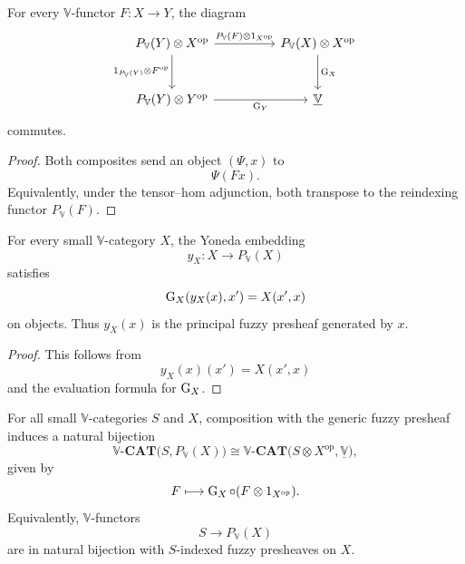 \begin{proposition}
\label{prop:enriched-naturality-generic-fuzzy-presheaf}
    For every \(\mathbb V\)-functor \(F:X\to Y\), the diagram
    \[
        \begin{tikzcd}[column sep=huge,row sep=large]
            P_{\mathbb V}(Y)\otimes X^{\mathrm{op}}
                \arrow[r,"P_{\mathbb V}(F)\otimes 1_{X^{\mathrm{op}}}"]
                \arrow[d,"1_{P_{\mathbb V}(Y)}\otimes F^{\mathrm{op}}"']
            &
            P_{\mathbb V}(X)\otimes X^{\mathrm{op}}
                \arrow[d,"\Gen_X"]
            \\
            P_{\mathbb V}(Y)\otimes Y^{\mathrm{op}}
                \arrow[r,"\Gen_Y"']
            &
            \underline{\mathbb V}
        \end{tikzcd}
    \]
    commutes.
\end{proposition}

\begin{proof}
    Both composites send an object \((\Psi,x)\) to
    \[
        \Psi(Fx).
    \]
    Equivalently, under the tensor--hom adjunction, both transpose to the reindexing functor \(P_{\mathbb V}(F)\).
\end{proof}

\begin{proposition}
\label{prop:principal-fuzzy-presheaves-in-cosmos}
    For every small \(\mathbb V\)-category \(X\), the Yoneda embedding
    \[
        y_X:X\to P_{\mathbb V}(X)
    \]
    satisfies
    \[
        \operatorname{G}_X(y_X(x),x')=X(x',x)
    \]
    on objects. Thus \(y_X(x)\) is the principal fuzzy presheaf generated by \(x\).
\end{proposition}

\begin{proof}
    This follows from
    \[
        y_X(x)(x')=X(x',x)
    \]
    and the evaluation formula for \(\operatorname{G}_X\).
\end{proof}

\begin{theorem}
\label{thm:universal-property-enriched-power-object}
    For all small \(\mathbb V\)-categories \(S\) and \(X\), composition with the generic fuzzy presheaf induces a natural bijection
    \[
        \mathbb V\text{-}\mathbf{CAT}
        \bigl(S,P_{\mathbb V}(X)\bigr)
        \cong
        \mathbb V\text{-}\mathbf{CAT}
        \bigl(S\otimes X^{\mathrm{op}},\underline{\mathbb V}\bigr),
    \]
    given by
    \[
        F\longmapsto \operatorname{G}_X\circ (F\otimes 1_{X^{\mathrm{op}}}).
    \]
    Equivalently, \(\mathbb V\)-functors
    \[
        S\to P_{\mathbb V}(X)
    \]
    are in natural bijection with \(S\)-indexed fuzzy presheaves on \(X\).
\end{theorem}

